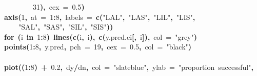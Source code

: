 \documentclass{article}
\makeatletter
\newcommand{\hlnumber}[1]{\textcolor[rgb]{0,0,0}{#1}}%
\newcommand{\hlfunctioncall}[1]{\textcolor[rgb]{.5,0,.33}{\textbf{#1}}}%
\newcommand{\hlstring}[1]{\textcolor[rgb]{.6,.6,1}{#1}}%
\newcommand{\hlkeyword}[1]{\textbf{#1}}%
\newcommand{\hlargument}[1]{\textcolor[rgb]{.69,.25,.02}{#1}}%
\newcommand{\hlsymbol}[1]{#1}%
\newcommand{\hlstd}[1]{\textcolor[rgb]{0,0,0}{#1}}%
\newenvironment{kframe}{%
 \def\FrameCommand##1{\hskip\@totalleftmargin \hskip-\fboxsep
 \colorbox{shadecolor}{##1}\hskip-\fboxsep
     \hskip-\linewidth \hskip-\@totalleftmargin \hskip\columnwidth}%
 \MakeFramed {\advance\hsize-\width
   \@totalleftmargin\z@ \linewidth\hsize
   \@setminipage}}%
 {\par\unskip\endMakeFramed}
\newenvironment{knitrout}{}{} %
\makeatother
\begin{document}
\begin{knitrout}
{\begin{kframe}
\begin{flushleft}
\hlstd{}{\ }{\ }{\ }{\ }{\ }{\ }{\ }{\ }\hlnumber{31}\hlkeyword{)}\hlkeyword{,}{\ }\hlargument{cex}{\ }\hlargument{=}{\ }\hlnumber{0.5}\hlkeyword{)}\hspace*{\fill}\\
\hlstd{}\hlfunctioncall{axis}\hlkeyword{(}\hlnumber{1}\hlkeyword{,}{\ }\hlargument{at}{\ }\hlargument{=}{\ }\hlnumber{1}\hlkeyword{:}\hlnumber{8}\hlkeyword{,}{\ }\hlargument{labels}{\ }\hlargument{=}{\ }\hlfunctioncall{c}\hlkeyword{(}\hlstring{"{}LAL"{}}\hlkeyword{,}{\ }\hlstring{"{}LAS"{}}\hlkeyword{,}{\ }\hlstring{"{}LIL"{}}\hlkeyword{,}{\ }\hlstring{"{}LIS"{}}\hlkeyword{,}\hspace*{\fill}\\
\hlstd{}{\ }{\ }{\ }{\ }\hlstring{"{}SAL"{}}\hlkeyword{,}{\ }\hlstring{"{}SAS"{}}\hlkeyword{,}{\ }\hlstring{"{}SIL"{}}\hlkeyword{,}{\ }\hlstring{"{}SIS"{}}\hlkeyword{)}\hlkeyword{)}\hspace*{\fill}\\
\hlstd{}\hlkeyword{for}{\ }\hlkeyword{(}\hlsymbol{i}{\ }\hlkeyword{in}{\ }\hlnumber{1}\hlkeyword{:}\hlnumber{8}\hlkeyword{)}{\ }\hlfunctioncall{lines}\hlkeyword{(}\hlfunctioncall{c}\hlkeyword{(}\hlsymbol{i}\hlkeyword{,}{\ }\hlsymbol{i}\hlkeyword{)}\hlkeyword{,}{\ }\hlfunctioncall{c}\hlkeyword{(}\hlsymbol{y.pred.ci}\hlkeyword{[}\hlkeyword{,}{\ }\hlsymbol{i}\hlkeyword{]}\hlkeyword{)}\hlkeyword{,}{\ }\hlargument{col}{\ }\hlargument{=}{\ }\hlstring{"{}grey"{}}\hlkeyword{)}\hspace*{\fill}\\
\hlstd{}\hlfunctioncall{points}\hlkeyword{(}\hlnumber{1}\hlkeyword{:}\hlnumber{8}\hlkeyword{,}{\ }\hlsymbol{y.pred}\hlkeyword{,}{\ }\hlargument{pch}{\ }\hlargument{=}{\ }\hlnumber{19}\hlkeyword{,}{\ }\hlargument{cex}{\ }\hlargument{=}{\ }\hlnumber{0.5}\hlkeyword{,}{\ }\hlargument{col}{\ }\hlargument{=}{\ }\hlstring{"{}black"{}}\hlkeyword{)}\hspace*{\fill}\\
\hlstd{}\hspace*{\fill}\\
\hlstd{}\hlfunctioncall{plot}\hlkeyword{(}\hlkeyword{(}\hlnumber{1}\hlkeyword{:}\hlnumber{8}\hlkeyword{)}{\ }\hlkeyword{+}{\ }\hlnumber{0.2}\hlkeyword{,}{\ }\hlsymbol{d}\hlkeyword{\usebox{\hlnormalsizeboxdollar}}\hlsymbol{y}\hlkeyword{/}\hlsymbol{d}\hlkeyword{\usebox{\hlnormalsizeboxdollar}}\hlsymbol{n}\hlkeyword{,}{\ }\hlargument{col}{\ }\hlargument{=}{\ }\hlstring{"{}slateblue"{}}\hlkeyword{,}{\ }\hlargument{ylab}{\ }\hlargument{=}{\ }\hlstring{"{}proportion{\ }successful"{}}\hlkeyword{,}\hspace*{\fill}\\

\end{flushleft}
\end{kframe}}
\end{knitrout}
\end{document}
